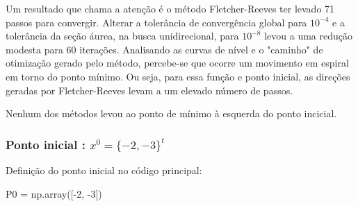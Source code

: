 \documentclass[10pt, a4paper]{article}
\begin{document}


Um resultado que chama a atenção é o método Fletcher-Reeves ter levado 71 passos para convergir. Alterar a tolerância
de convergência global para $10^{-4}$ e a tolerância da seção áurea, na busca unidirecional, para $10^{-8}$ levou a uma
redução modesta para 60 iterações. Analisando as curvas de nível e o "caminho" de otimização gerado pelo método,
percebe-se que ocorre um movimento em espiral em torno do ponto mínimo. Ou seja, para essa função e ponto inicial,
as direções geradas por Fletcher-Reeves levam a um elevado número de passos.

Nenhum dos métodos levou ao ponto de mínimo à esquerda do ponto incicial.


\subsubsection{Ponto inicial : $x^0 = \{-2,-3\}^t $}

Definição do ponto inicial no código principal:
\begin{python}
  P0 = np.array([-2, -3])
\end{python}
\end{document}
